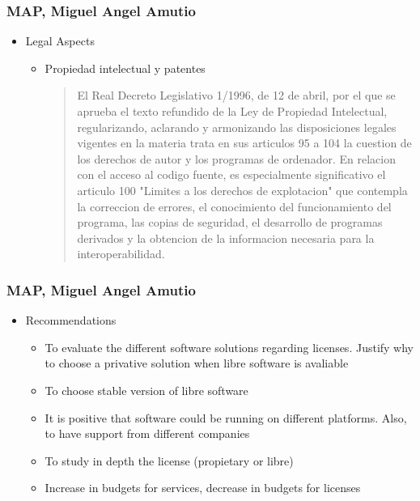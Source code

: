 \documentclass{beamer}
\begin{document}
\begin{frame}
\frametitle{ MAP, Miguel Angel Amutio}

\begin{itemize}
\item Legal Aspects
\begin {itemize}
	\item Propiedad intelectual y patentes

	\begin{quote} 
El Real Decreto Legislativo 1/1996, de 12 de abril, por el que se aprueba el texto refundido de la Ley de Propiedad Intelectual,
regularizando, aclarando y armonizando las disposiciones legales vigentes en la materia trata en sus articulos 95 a 104 la
cuestion de los derechos de autor y los programas de ordenador. En relacion con el acceso al codigo fuente, es
especialmente significativo el articulo 100 "Limites a los derechos de explotacion" que contempla la correccion de
errores, el conocimiento del funcionamiento del programa, las copias de seguridad, el desarrollo de programas
derivados y la obtencion de la informacion necesaria para la interoperabilidad.


	\end{quote}
\end {itemize}
\end{itemize}

\end{frame}


\begin{frame}
\frametitle{MAP, Miguel Angel Amutio}

\begin{itemize}
\item Recommendations
\begin{itemize}
	\item To evaluate the different software solutions regarding licenses. Justify why to choose a privative solution when libre software is avaliable
	\item To choose stable version of libre software
	\item It is positive that software could be running on different platforms. Also, to have support from different companies
	\item To study in depth the license (propietary or libre)
	\item Increase in budgets for services, decrease in budgets for licenses
\end{itemize}
\end{itemize}

\end{frame}
\end{document}
